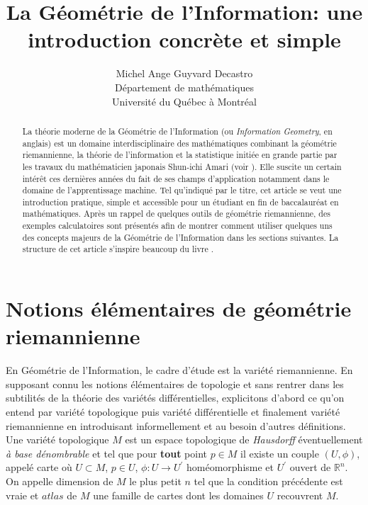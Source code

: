 \documentclass[11pt,french]{article}
\title{\textbf{\color{blue}La Géométrie de l'Information: une introduction concrète et simple}}
\author{Michel Ange Guyvard Decastro\\
  Département de mathématiques\\
Université du Québec à Montréal	}
\begin{document}
	\maketitle

\renewcommand{\abstractname}{Résumé}
	
\begin{abstract}
La théorie moderne de la Géométrie de l'Information (ou \textit{Information Geometry}, en anglais) est un domaine interdisciplinaire des mathématiques combinant la géométrie riemannienne, la théorie de l'information et la statistique initiée en grande partie par les travaux du mathématicien japonais Shun-ichi Amari (voir \cite{amari1985differential}). Elle suscite un certain intérêt ces dernières années du fait de ses champs d'application notamment dans le domaine de l'apprentissage machine. Tel qu'indiqué par le titre, cet article se veut une introduction pratique, simple et accessible pour un étudiant en fin de baccalauréat en mathématiques. Après un rappel de quelques outils de géométrie riemannienne, des exemples calculatoires sont présentés afin de montrer comment utiliser quelques uns des concepts majeurs de la Géométrie de l'Information dans les sections suivantes. La structure de cet article s'inspire beaucoup du livre \cite{calin2014geometric}.
	 	
\end{abstract}
\nocite{*}
\section{Notions élémentaires de géométrie riemannienne}
En Géométrie de l'Information, le cadre d'étude est la variété riemannienne. En supposant connu les notions élémentaires de topologie et sans rentrer dans les subtilités de la théorie des variétés différentielles, explicitons d'abord ce qu'on entend par variété topologique puis variété différentielle et finalement variété riemannienne en introduisant informellement et au besoin d'autres définitions.\\

Une variété topologique $M$ est un espace topologique de \textit{Hausdorff} éventuellement \textit{à base dénombrable} et tel que pour \textbf{tout} point $p\in M$ il existe un couple $(U, \phi)$, appelé carte où $U\subset M$, $p \in U$, $\phi:U \longrightarrow U^{'}$ homéomorphisme et $U^{'}$ ouvert de $\mathbb{R}^{n}$.  
On appelle dimension de $M$ le plus petit $n$ tel que la condition précédente est vraie et $atlas$ de $M$ une famille de cartes dont les domaines $U$ recouvrent $M$.
\end{document}

